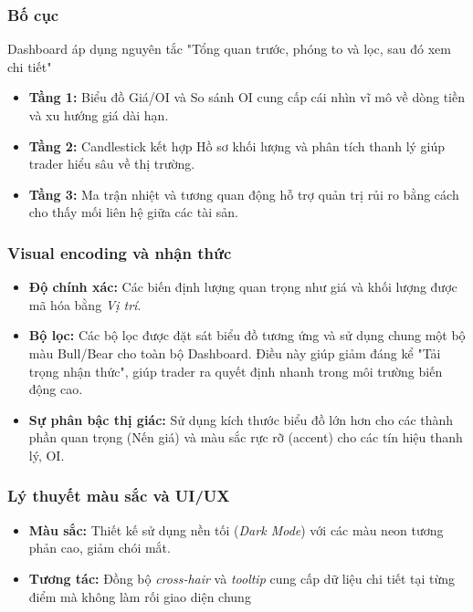 \subsubsection{Bố cục}
Dashboard áp dụng nguyên tắc "Tổng quan trước, phóng to và lọc, sau đó xem chi tiết"
\begin{itemize}
    \item \textbf{Tầng 1:} Biểu đồ Giá/OI và So sánh OI cung cấp cái nhìn vĩ mô về dòng tiền và xu hướng giá dài hạn.
    \item \textbf{Tầng 2:} Candlestick kết hợp Hồ sơ khối lượng và phân tích thanh lý giúp trader hiểu sâu về thị trường.
    \item \textbf{Tầng 3:} Ma trận nhiệt và tương quan động hỗ trợ quản trị rủi ro bằng cách cho thấy mối liên hệ giữa các tài sản.
\end{itemize}

\subsubsection{Visual encoding và nhận thức}
\begin{itemize}
    \item \textbf{Độ chính xác:} Các biến định lượng quan trọng như giá và khối lượng được mã hóa bằng \textit{Vị trí}.
    \item \textbf{Bộ lọc:} Các bộ lọc được đặt sát biểu đồ tương ứng và sử dụng chung một bộ màu Bull/Bear cho toàn bộ Dashboard. Điều này giúp giảm đáng kể "Tải trọng nhận thức", giúp trader ra quyết định nhanh trong môi trường biến động cao.
    \item \textbf{Sự phân bậc thị giác:} Sử dụng kích thước biểu đồ lớn hơn cho các thành phần quan trọng (Nến giá) và màu sắc rực rỡ (accent) cho các tín hiệu thanh lý, OI.
\end{itemize}

\subsubsection{Lý thuyết màu sắc và UI/UX}
\begin{itemize}
    \item \textbf{Màu sắc:} Thiết kế sử dụng nền tối (\textit{Dark Mode}) với các màu neon tương phản cao, giảm chói mắt.
    \item \textbf{Tương tác:} Đồng bộ \textit{cross-hair} và \textit{tooltip} cung cấp dữ liệu chi tiết tại từng điểm mà không làm rối giao diện chung
\end{itemize}

